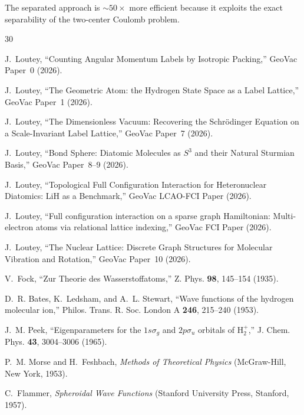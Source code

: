 \documentclass[aps,pra,twocolumn,superscriptaddress,longbibliography]{revtex4-2}
\begin{document}
The separated approach is $\sim 50\times$ more efficient because it
exploits the exact separability of the two-center Coulomb problem.


\begin{thebibliography}{30}

J.~Loutey,
``Counting Angular Momentum Labels by Isotropic Packing,''
GeoVac Paper~0 (2026).

J.~Loutey,
``The Geometric Atom: the Hydrogen State Space as a Label Lattice,''
GeoVac Paper~1 (2026).

J.~Loutey,
``The Dimensionless Vacuum: Recovering the Schr\"odinger Equation
on a Scale-Invariant Label Lattice,''
GeoVac Paper~7 (2026).

J.~Loutey,
``Bond Sphere: Diatomic Molecules as $S^3$ and their Natural
Sturmian Basis,''
GeoVac Paper~8--9 (2026).

J.~Loutey,
``Topological Full Configuration Interaction for Heteronuclear
Diatomics: LiH as a Benchmark,''
GeoVac LCAO-FCI Paper (2026).

J.~Loutey,
``Full configuration interaction on a sparse graph Hamiltonian:
Multi-electron atoms via relational lattice indexing,''
GeoVac FCI Paper (2026).

J.~Loutey,
``The Nuclear Lattice: Discrete Graph Structures for Molecular
Vibration and Rotation,''
GeoVac Paper~10 (2026).

V.~Fock,
``Zur Theorie des Wasserstoffatoms,''
Z. Phys. \textbf{98}, 145--154 (1935).

D.~R. Bates, K.~Ledsham, and A.~L. Stewart,
``Wave functions of the hydrogen molecular ion,''
Philos. Trans. R. Soc. London A \textbf{246}, 215--240 (1953).

J.~M. Peek,
``Eigenparameters for the $1s\sigma_g$ and $2p\sigma_u$ orbitals of
H$_2^+$,''
J. Chem. Phys. \textbf{43}, 3004--3006 (1965).

P.~M. Morse and H.~Feshbach,
\textit{Methods of Theoretical Physics}
(McGraw-Hill, New York, 1953).

C.~Flammer,
\textit{Spheroidal Wave Functions}
(Stanford University Press, Stanford, 1957).


\end{thebibliography}
\end{document}
